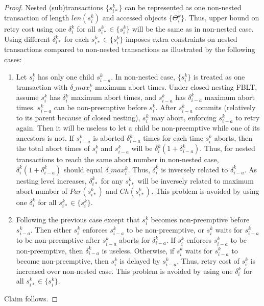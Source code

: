 \documentclass[letter]{sig-alternate}
\begin{document}
\begin{proof}

Nested (sub)transactions $\{s_{i*}^{k}\}$ can be represented as one
non-nested transaction of length $len(s_{i}^{k})$ and accessed objects
$\{\Theta_{i}^{k}\}$. Thus, upper bound on retry cost using one $\delta_{i}^{k}$
for all $s_{i*}^{k}\in\{s_{i}^{k}\}$ will be the same as in non-nested
case. Using different $\delta_{i*}^{k}$ for each $s_{i*}^{k}\in\{s_{i}^{k}\}$
imposes extra constraints on nested transactions compared to non-nested
transactions as illustrated by the following cases:
\begin{enumerate}
\item Let $s_{i}^{k}$ has only one child $s_{i-a}^{k}$. In non-nested
case, $\{s_{i}^{k}\}$ is treated as one transaction with $\delta\_max_{i}^{k}$
maximum abort times. Under closed nesting FBLT, assume $s_{i}^{k}$
has $\delta{}_{i}^{k}$ maximum abort times, and $s_{i-a}^{k}$ has
$\delta_{i-a}^{k}$ maximum abort times. $s_{i-a}^{k}$ can be non-preemptive
before $s_{i}^{k}$. After $s_{i-a}^{k}$ commits (relatively to its
parent because of closed nesting), $s_{i}^{k}$ may abort, enforcing
$s_{i-a}^{k}$ to retry again. Then it will be useless to let a child
be non-preemptive while one of its ancestors is not. If $s_{i-a}^{k}$
is aborted $\delta_{i-a}^{k}$ times for each time $s_{i}^{k}$ aborts,
then the total abort times of $s_{i}^{k}$ and $s_{i-a}^{k}$ will
be $\delta_{i}^{k}\left(1+\delta_{i-a}^{k}\right)$. Thus, for nested
transactions to reach the same abort number in non-nested case, $\delta_{i}^{k}\left(1+\delta_{i-a}^{k}\right)$
should equal $\delta\_max_{i}^{k}$. Thus, $\delta_{i}^{k}$ is inversely
related to $\delta_{i-a}^{k}$. As nesting level increases, $\delta_{i*}^{k}$
for any $s_{i*}^{k}$ will be inversely related to maximum abort number
of $Par(s_{i*}^{k})$ and $Ch(s_{i*}^{k})$. This problem is avoided
by using one $\delta_{i}^{k}$ for all $s_{i*}^{k}\in\{s_{i}^{k}\}$.
\item Following the previous case except that $s_{i}^{k}$ becomes non-preemptive
before $s_{i-a}^{k}$. Then either $s_{i}^{k}$ enforces $s_{i-a}^{k}$
to be non-preemptive, or $s_{i}^{k}$ waits for $s_{i-a}^{k}$ to
be non-preemptive after $s_{i-a}^{k}$ aborts for $\delta_{i-a}^{k}$.
If $s_{i}^{k}$ enforces $s_{i-a}^{k}$ to be non-preemptive, then
$\delta_{i-a}^{k}$ is useless. Otherwise, if $s_{i}^{k}$ waits for
$s_{i-a}^{k}$ to become non-preemptive, then $s_{i}^{k}$ is delayed
by $s_{i-a}^{k}$. Thus, retry cost of $s_{i}^{k}$ is increased over
non-nested case. This problem is avoided by using one $\delta_{i}^{k}$
for all $s_{i*}^{k}\in\{s_{i}^{k}\}$.
\end{enumerate}
Claim follows.

\end{proof}
\end{document}

